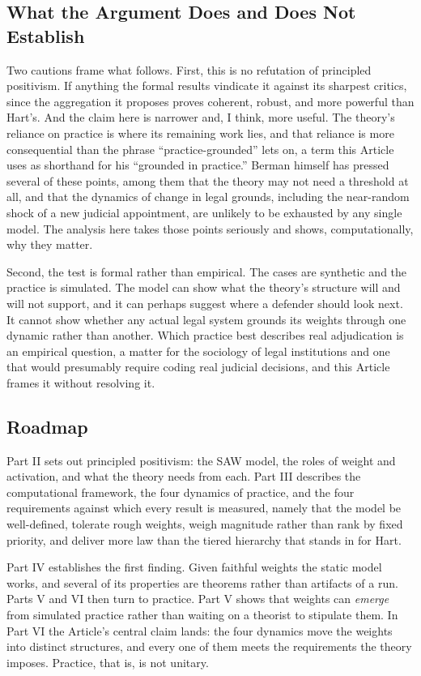 \subsection*{What the Argument Does and Does Not Establish}

Two cautions frame what follows. First, this is no refutation of principled
positivism. If anything the formal results vindicate it against its
sharpest critics, since the aggregation it proposes proves coherent, robust,
and more powerful than Hart's. And the claim here is narrower and, I think, more useful. The theory's reliance on practice is where its remaining work lies,
and that reliance is more consequential than the phrase
``practice-grounded'' lets on, a term this Article uses as shorthand for
his ``grounded in practice.'' Berman himself has pressed several of these
points, among them that the theory may not need a threshold at all, and that
the dynamics of change in legal grounds, including the near-random shock
of a new judicial appointment, are unlikely to be exhausted by any single
model. The analysis here takes those points seriously and shows,
computationally, why they matter.

Second, the test is formal rather than empirical. The cases are synthetic
and the practice is simulated. The model can show what the theory's structure will and will not
support, and it can perhaps suggest where a defender should look next. It cannot show whether any actual legal system grounds its weights through one
dynamic rather than another. Which practice best describes real adjudication is an empirical
question, a matter for the sociology of legal institutions and one that would
presumably require coding real judicial decisions, and this Article frames it
without resolving it.

\subsection*{Roadmap}

Part II sets out principled positivism: the SAW model, the roles of weight
and activation, and what the theory needs from each. Part III describes the
computational framework, the four dynamics of practice, and the four
requirements against which every result is measured, namely that the model
be well-defined, tolerate rough weights, weigh magnitude rather than rank by
fixed priority, and deliver more law than the tiered hierarchy that stands in
for Hart.

Part IV establishes the first finding. Given faithful weights the static
model works, and several of its properties are theorems rather than
artifacts of a run. Parts V and VI then turn to practice. Part V shows that
weights can \textit{emerge} from simulated practice rather than waiting on a
theorist to stipulate them. In Part VI the Article's central claim lands:
the four dynamics move the weights into distinct structures, and every one
of them meets the requirements the theory imposes. Practice, that is, is not
unitary.

